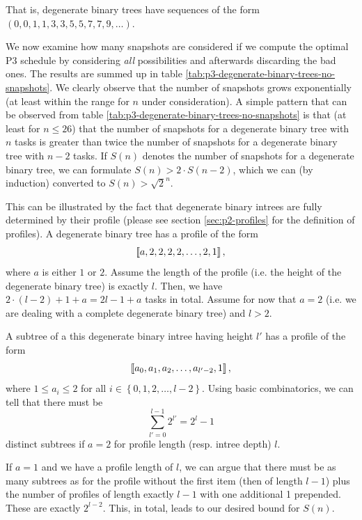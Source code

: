 That is, degenerate binary trees have sequences of the form $(0,0,1,1,3,3,5,5,7,7,9,\dots)$.

We now examine how many snapshots are considered if we compute the optimal P3 schedule by considering \emph{all} possibilities and afterwards discarding the bad ones. The results are summed up in table \ref{tab:p3-degenerate-binary-trees-no-snapshots}. We clearly observe that the number of snapshots grows exponentially (at least within the range for $n$ under consideration). A simple pattern that can be observed from table \ref{tab:p3-degenerate-binary-trees-no-snapshots} is that (at least for $n\leq 26$) that the number of snapshots for a degenerate binary tree with $n$ tasks is greater than twice the number of snapshots for a degenerate binary tree with $n-2$ tasks. If $S(n)$ denotes the number of snapshots for a degenerate binary tree, we can formulate $S(n)>2\cdot S(n-2)$, which we can (by induction) converted to $S(n) > \sqrt 2 ^ n$.

This can be illustrated by the fact that degenerate binary intrees are fully determined by their profile (please see section \ref{sec:p2-profiles} for the definition of profiles). A degenerate binary tree has a profile of the form
\begin{equation*}
  \left\llbracket a,2,2,2,2,\dots,2,1 \right\rrbracket,
\end{equation*}
where $a$ is either $1$ or $2$. Assume the length of the profile (i.e. the height of the degenerate binary tree) is exactly $l$. Then, we have $2\cdot(l-2)+1+a = 2l-1+a$ tasks in total. Assume for now that $a=2$ (i.e. we are dealing with a complete degenerate binary tree) and $l>2$.

A subtree of a this degenerate binary intree having height $l'$ has a profile of the form
\begin{equation*}
  \left\llbracket a_0,a_1,a_2,\dots,a_{l'-2},1 \right\rrbracket,
\end{equation*}
where $1\leq a_i \leq 2$ for all $i\in\left\{ 0,1,2,\dots,l-2 \right\}$. Using basic combinatorics, we can tell that there must be
\begin{equation*}
  \sum_{l'=0}^{l-1} 2^{l'} = 2^{l} -1
\end{equation*}
distinct subtrees if $a=2$ for profile length (resp. intree depth) $l$.

If $a=1$ and we have a profile length of $l$, we can argue that there must be as many subtrees as for the profile without the first item (then of length $l-1$) plus the number of profiles of length exactly $l-1$ with one additional 1 prepended. These are exactly $2^{l-2}$. This, in total, leads to our desired bound for $S(n)$.

